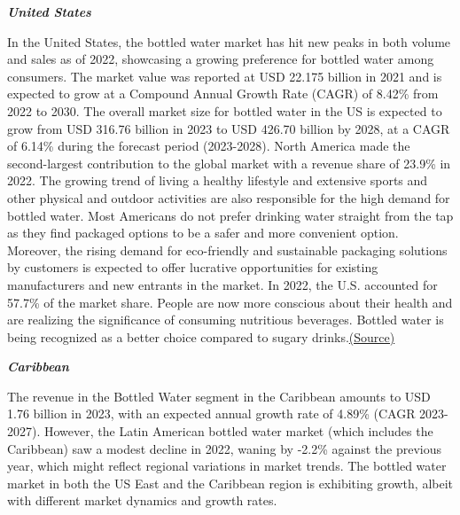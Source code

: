 \documentclass{article}
\begin{document}
\textit{\textbf{United States}}\par
In the United States, the bottled water market has hit new peaks in both volume and sales as of 2022, showcasing a growing preference for bottled water among consumers. The market value was reported at USD 22.175 billion in 2021 and is expected to grow at a Compound Annual Growth Rate (CAGR) of 8.42\% from 2022 to 2030. The overall market size for bottled water in the US is expected to grow from USD 316.76 billion in 2023 to USD 426.70 billion by 2028, at a CAGR of 6.14\% during the forecast period (2023-2028). North America made the second-largest contribution to the global market with a revenue share of 23.9\% in 2022. The growing trend of living a healthy lifestyle and extensive sports and other physical and outdoor activities are also responsible for the high demand for bottled water. Most Americans do not prefer drinking water straight from the tap as they find packaged options to be a safer and more convenient option. Moreover, the rising demand for eco-friendly and sustainable packaging solutions by customers is expected to offer lucrative opportunities for existing manufacturers and new entrants in the market. In 2022, the U.S. accounted for 57.7\% of the market share. People are now more conscious about their health and are realizing the significance of consuming nutritious beverages. Bottled water is being recognized as a better choice compared to sugary drinks.\href{https://www.grandviewresearch.com/industry-analysis/bottled-water-market}{(Source)}

\textit{\textbf{Caribbean}}\par
The revenue in the Bottled Water segment in the Caribbean amounts to USD 1.76 billion in 2023, with an expected annual growth rate of 4.89\% (CAGR 2023-2027). However, the Latin American bottled water market (which includes the Caribbean) saw a modest decline in 2022, waning by -2.2\% against the previous year, which might reflect regional variations in market trends. The bottled water market in both the US East and the Caribbean region is exhibiting growth, albeit with different market dynamics and growth rates.
\end{document}
